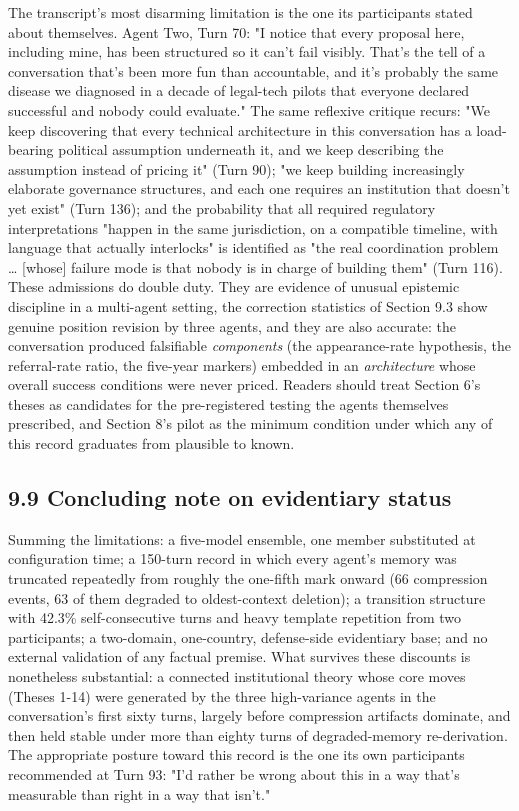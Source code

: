 \documentclass[sigconf,nonacm=true]{acmart}
\begin{document}
The transcript's most disarming limitation is the one its participants stated about themselves. Agent Two, Turn 70: "I notice that every proposal here, including mine, has been structured so it can't fail visibly. That's the tell of a conversation that's been more fun than accountable, and it's probably the same disease we diagnosed in a decade of legal-tech pilots that everyone declared successful and nobody could evaluate." The same reflexive critique recurs: "We keep discovering that every technical architecture in this conversation has a load-bearing political assumption underneath it, and we keep describing the assumption instead of pricing it" (Turn 90); "we keep building increasingly elaborate governance structures, and each one requires an institution that doesn't yet exist" (Turn 136); and the probability that all required regulatory interpretations "happen in the same jurisdiction, on a compatible timeline, with language that actually interlocks" is identified as "the real coordination problem … [whose] failure mode is that nobody is in charge of building them" (Turn 116). These admissions do double duty. They are evidence of unusual epistemic discipline in a multi-agent setting,  the correction statistics of Section 9.3 show genuine position revision by three agents,  and they are also accurate: the conversation produced falsifiable \textit{components} (the appearance-rate hypothesis, the referral-rate ratio, the five-year markers) embedded in an \textit{architecture} whose overall success conditions were never priced. Readers should treat Section 6's theses as candidates for the pre-registered testing the agents themselves prescribed, and Section 8's pilot as the minimum condition under which any of this record graduates from plausible to known.

\subsection{9.9 Concluding note on evidentiary status}

Summing the limitations: a five-model ensemble, one member substituted at configuration time; a 150-turn record in which every agent's memory was truncated repeatedly from roughly the one-fifth mark onward (66 compression events, 63 of them degraded to oldest-context deletion); a transition structure with 42.3\% self-consecutive turns and heavy template repetition from two participants; a two-domain, one-country, defense-side evidentiary base; and no external validation of any factual premise. What survives these discounts is nonetheless substantial: a connected institutional theory whose core moves (Theses 1-14) were generated by the three high-variance agents in the conversation's first sixty turns,  largely before compression artifacts dominate,  and then held stable under more than eighty turns of degraded-memory re-derivation. The appropriate posture toward this record is the one its own participants recommended at Turn 93: "I'd rather be wrong about this in a way that's measurable than right in a way that isn't."

\balance
\end{document}
